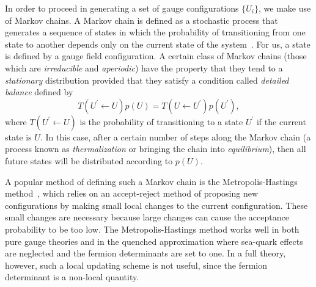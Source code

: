 In order to proceed in generating a set of gauge configurations $\{U_i\}$, we make use of Markov chains. A Markov chain is defined as a stochastic process that generates a sequence of states in which the probability of transitioning from one state to another depends only on the current state of the system~\cite{Morningstar:2007zm}. For us, a state is defined by a gauge field configuration. A certain class of Markov chains (those which are \emph{irreducible} and \emph{aperiodic}) have the property that they tend to a \emph{stationary} distribution provided that they satisfy a condition called \emph{detailed balance} defined by
\begin{equation}
    T(U^\prime \leftarrow U)p(U) = T(U \leftarrow U^\prime)p(U^\prime),
\end{equation}
where $T(U^\prime \leftarrow U)$ is the probability of transitioning to a state $U^\prime$ if the current state is $U$. In this case, after a certain number of steps along the Markov chain (a process known as \emph{thermalization} or bringing the chain into \emph{equilibrium}), then all future states will be distributed according to $p(U)$.

A popular method of defining such a Markov chain is the Metropolis-Hastings method~\cite{Metropolis:1953am}, which relies on an accept-reject method of proposing new configurations by making small local changes to the current configuration. These small changes are necessary because large changes can cause the acceptance probability to be too low. The Metropolis-Hastings method works well in both pure gauge theories and in the quenched approximation where sea-quark effects are neglected and the fermion determinants are set to one. In a full theory, however, such a local updating scheme is not useful, since the fermion determinant is a non-local quantity.
